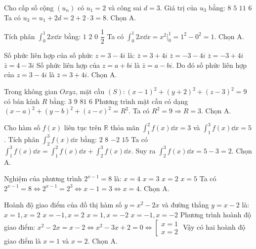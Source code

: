 \caugiai
{
Cho cấp số cộng \((u_n)\) có \(u_1 = 2\) và công sai \(d = 3\). Giá trị của \(u_3\) bằng:
\bonpa
{\(8\)}
{\(5\)}
{\(11\)}
{\(6\)}
}
{
Ta có \(u_3 = u_1 + 2d = 2 + 2 \cdot 3 = 8\). Chọn A.
}

\caugiai
{
Tích phân \(\displaystyle\int_0^1 2x \dd x\) bằng:
\bonpa
{\(1\)}
{\(2\)}
{\(0\)}
{\(\dfrac{1}{2}\)}
}
{
Ta có \(\displaystyle\int_0^1 2x \dd x = x^2 \Big|_0^1 = 1^2 - 0^2 = 1\). Chọn A.
}

\caugiai
{
Số phức liên hợp của số phức \(z = 3 - 4i\) là:
\bonpa
{\(\bar{z} = 3 + 4i\)}
{\(\bar{z} = -3 - 4i\)}
{\(\bar{z} = -3 + 4i\)}
{\(\bar{z} = 4 - 3i\)}
}
{
Số phức liên hợp của \(z = a + bi\) là \(\bar{z} = a - bi\). 
Do đó số phức liên hợp của \(z = 3 - 4i\) là \(\bar{z} = 3 + 4i\). Chọn A.
}

\caugiai
{
Trong không gian \(Oxyz\), mặt cầu \((S): (x-1)^2 + (y+2)^2 + (z-3)^2 = 9\) có bán kính \(R\) bằng:
\bonpa
{\(3\)}
{\(9\)}
{\(81\)}
{\(6\)}
}
{
Phương trình mặt cầu có dạng \((x-a)^2+(y-b)^2+(z-c)^2=R^2\). 
Ta có \(R^2 = 9 \Rightarrow R = 3\). Chọn A.
}

\caugiai
{
Cho hàm số \(f(x)\) liên tục trên \(\mathbb{R}\) thỏa mãn \(\displaystyle\int_1^2 f(x) \dd x = 3\) và \(\displaystyle\int_1^3 f(x) \dd x = 5\). Tích phân \(\displaystyle\int_2^3 f(x) \dd x\) bằng:
\bonpa
{\(2\)}
{\(8\)}
{\(-2\)}
{\(15\)}
}
{
Ta có \(\displaystyle\int_1^3 f(x) \dd x = \int_1^2 f(x) \dd x + \int_2^3 f(x) \dd x\).
Suy ra \(\displaystyle\int_2^3 f(x) \dd x = 5 - 3 = 2\). Chọn A.
}

\caugiai
{
Nghiệm của phương trình \(2^{x-1} = 8\) là:
\bonpa
{\(x = 4\)}
{\(x = 3\)}
{\(x = 2\)}
{\(x = 5\)}
}
{
Ta có \(2^{x-1} = 8 \Leftrightarrow 2^{x-1} = 2^3 \Leftrightarrow x - 1 = 3 \Leftrightarrow x = 4\). Chọn A.
}

\caugiai
{
Hoành độ giao điểm của đồ thị hàm số \(y=x^2-2x\) và đường thẳng \(y=x-2\) là:
\bonpa
{\(x=1, x=2\)}
{\(x=-1, x=2\)}
{\(x=1, x=-2\)}
{\(x=-1, x=-2\)}
}
{
Phương trình hoành độ giao điểm:
\(x^2 - 2x = x - 2 \Leftrightarrow x^2 - 3x + 2 = 0 \Leftrightarrow \left[ \begin{array}{l} x = 1 \\ x = 2 \end{array} \right.\)
Vậy có hai hoành độ giao điểm là \(x=1\) và \(x=2\). Chọn A.
}
